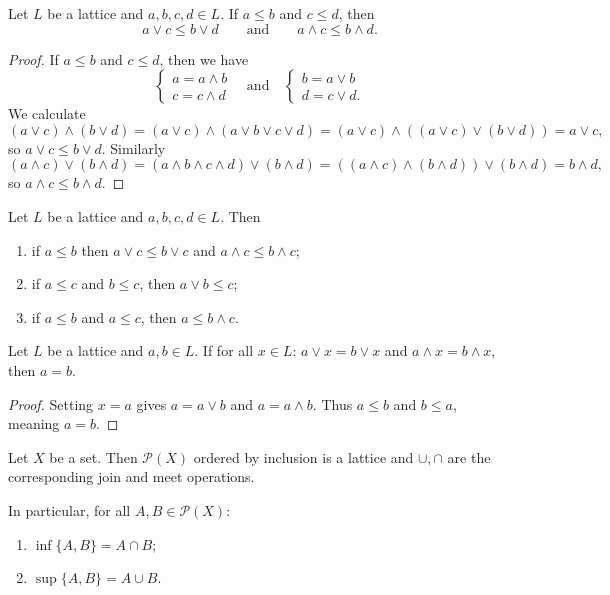 \begin{lemma} \label{orderLatticeLemma}
Let $L$ be a lattice and $a,b,c,d\in L$. If $a\leq b$ and $c\leq d$, then
\[ a\vee c\leq b\vee d \qquad\text{and}\qquad a\wedge c \leq b\wedge d. \]
\end{lemma}
\begin{proof}
If $a\leq b$ and $c\leq d$, then we have
\[ \begin{cases}
a = a\wedge b \\ c = c\wedge d
\end{cases} \quad \text{and} \quad \begin{cases}
b = a\vee b \\ d = c\vee d.
\end{cases}\]
We calculate
\[ (a\vee c)\wedge (b\vee d) = (a\vee c)\wedge (a\vee b\vee c\vee d) = (a\vee c)\wedge ((a\vee c)\vee (b\vee d)) = a\vee c, \]
so $a\vee c\leq b\vee d$.
Similarly
\[ (a\wedge c)\vee (b\wedge d) = (a\wedge b\wedge c\wedge d)\vee (b\wedge d) = ((a\wedge c)\wedge (b\wedge d))\vee (b\wedge d) = b\wedge d, \]
so $a\wedge c \leq b\wedge d$.
\end{proof}
\begin{corollary} \label{orderLatticeCorollary}
Let $L$ be a lattice and $a,b,c,d\in L$. Then
\begin{enumerate}
\item if $a\leq b$ then $a\vee c \leq b \vee c$ and $a\wedge c \leq b\wedge c$;
\item if $a\leq c$ and $b\leq c$, then $a\vee b \leq c$;
\item if $a\leq b$ and $a\leq c$, then $a\leq b\wedge c$.
\end{enumerate}
\end{corollary}

\begin{lemma} \label{cancellationGeneralLattices}
Let $L$ be a lattice and $a,b\in L$. If for all $x\in L$: $a\vee x = b\vee x$ and $a\wedge x = b\wedge x$, then $a = b$.
\end{lemma}
\begin{proof}
Setting $x = a$ gives $a = a\vee b$ and $a = a\wedge b$. Thus $a \leq b$ and $b \leq a$, meaning $a = b$.
\end{proof}

\begin{lemma}
Let $X$ be a set. Then $\mathcal{P}(X)$ ordered by inclusion is a lattice and $\cup, \cap$ are the corresponding join and meet operations.

In particular, for all $A,B\in \mathcal{P}(X)$:
\begin{enumerate}
\item $\inf\{A,B\} = A\cap B$;
\item $\sup\{A,B\} = A\cup B$.
\end{enumerate}
\end{lemma}

